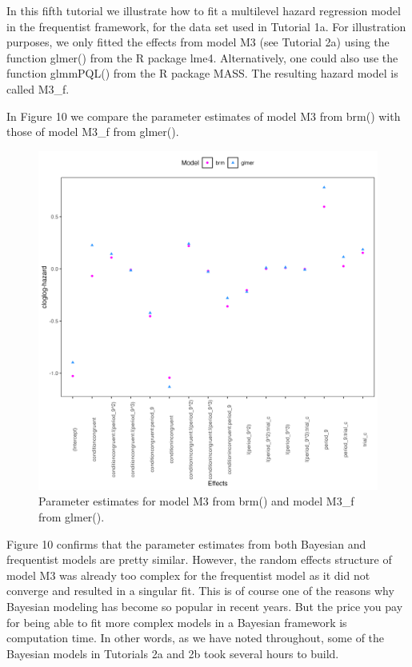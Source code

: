 \documentclass[
  man,floatsintext]{apa6}
\begin{document}
In this fifth tutorial we illustrate how to fit a multilevel hazard regression model in the frequentist framework, for the data set used in Tutorial 1a. For illustration purposes, we only fitted the effects from model M3 (see Tutorial 2a) using the function glmer() from the R package lme4. Alternatively, one could also use the function glmmPQL() from the R package MASS. The resulting hazard model is called M3\_f.

In Figure 10 we compare the parameter estimates of model M3 from brm() with those of model M3\_f from glmer().



\begin{figure}[H]

{\centering \includegraphics[width=0.8\linewidth,height=0.67\textheight,]{../Tutorial_3_Frequentist/comparison} 

}

\caption{Parameter estimates for model M3 from brm() and model M3\_f from glmer().}\label{fig:plot-comparison}
\end{figure}

Figure 10 confirms that the parameter estimates from both Bayesian and frequentist models are pretty similar. However, the random effects structure of model M3 was already too complex for the frequentist model as it did not converge and resulted in a singular fit. This is of course one of the reasons why Bayesian modeling has become so popular in recent years. But the price you pay for being able to fit more complex models in a Bayesian framework is computation time. In other words, as we have noted throughout, some of the Bayesian models in Tutorials 2a and 2b took several hours to build.
\end{document}

